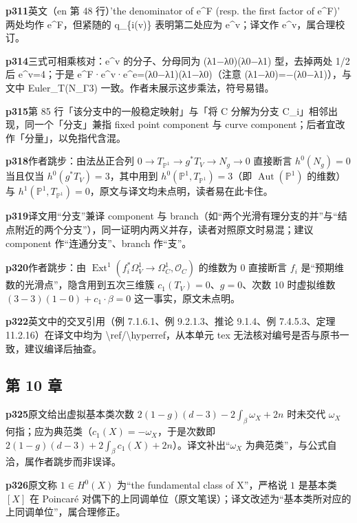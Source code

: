\noindent\textbf{\footnotesize p311}\quad 英文（en 第 48 行）'the denominator of e\^{}F (resp. the first factor of e\^{}F)' 两处均作 e\^{}F，但紧随的 q\_\{i(v)\} 表明第二处应为 e\^{}v；译文作 e\^{}v，属合理校订。

\noindent\textbf{\footnotesize p314}\quad 三式可相乘核对：e\^{}v 的分子、分母同为 (λ1−λ0)(λ0−λ1) 型，去掉两处 1/2 后 e\^{}v=4；于是 e\^{}F·e\^{}v·e\^{}e=(λ0−λ1)(λ1−λ0)（注意 (λ1−λ0)=−(λ0−λ1)），与文中 Euler\_T(N\_Γ3) 一致。作者未展示这步乘法，符号易错。

\noindent\textbf{\footnotesize p315}\quad 第 85 行「该分支中的一般稳定映射」与「将 C 分解为分支 C\_i」相邻出现，同一个「分支」兼指 fixed point component 与 curve component；后者宜改作「分量」，以免指代含混。

\noindent\textbf{\footnotesize p318}\quad 作者跳步：由法丛正合列 $0\to T_{\mathbb P^1}\to g^*T_V\to N_g\to0$ 直接断言 $h^0(N_g)=0$ 当且仅当 $h^0(g^*T_V)=3$，其中用到 $h^0(\mathbb P^1,T_{\mathbb P^1})=3$（即 $\operatorname{Aut}(\mathbb P^1)$ 的维数）与 $h^1(\mathbb P^1,T_{\mathbb P^1})=0$，原文与译文均未点明，读者易在此卡住。

\noindent\textbf{\footnotesize p319}\quad 译文用“分支”兼译 component 与 branch（如“两个光滑有理分支的并”与“结点附近的两个分支”），同一证明内两义并存，读者对照原文时易混；建议 component 作“连通分支”、branch 作“支”。

\noindent\textbf{\footnotesize p320}\quad 作者跳步：由 $\operatorname{Ext}^1(f_i^*\Omega_V^1\to\Omega_C^1,\mathcal O_C)$ 的维数为 0 直接断言 $f_i$ 是“预期维数的光滑点”，隐含用到五次三维簇 $c_1(T_V)=0$、$g=0$、次数 10 时虚拟维数 $(3-3)(1-0)+c_1\cdot\beta=0$ 这一事实，原文未点明。

\noindent\textbf{\footnotesize p322}\quad 英文中的交叉引用（例 7.1.6.1、例 9.2.1.3、推论 9.1.4、例 7.4.5.3、定理 11.2.16）在译文中均为 \textbackslash{}ref/\textbackslash{}hyperref，从本单元 tex 无法核对编号是否与原书一致，建议编译后抽查。


\subsection*{第 10 章}

\noindent\textbf{\footnotesize p325}\quad 原文给出虚拟基本类次数 $2(1-g)(d-3)-2\int_\beta\omega_X+2n$ 时未交代 $\omega_X$ 何指；应为典范类（$c_1(X)=-\omega_X$，于是次数即 $2(1-g)(d-3)+2\int_\beta c_1(X)+2n$）。译文补出“$\omega_X$ 为典范类”，与公式自洽，属作者跳步而非误译。

\noindent\textbf{\footnotesize p326}\quad 原文称 $1\in H^0(X)$ 为“the fundamental class of X”，严格说 $1$ 是基本类 $[X]$ 在 Poincaré 对偶下的上同调单位（原文笔误）；译文改述为“基本类所对应的上同调单位”，属合理修正。

